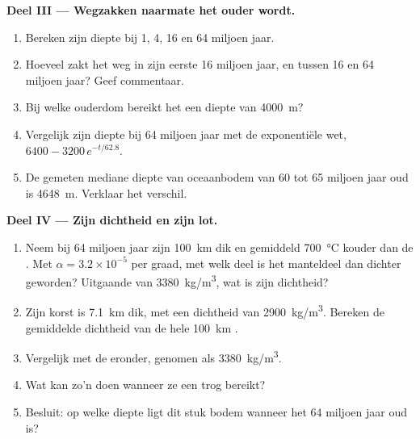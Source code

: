 \begin{problem}
\medskip
\noindent\textbf{Deel III --- Wegzakken naarmate het ouder wordt.}
\begin{enumerate}[resume]
  \item Bereken zijn diepte bij 1, 4, 16 en 64 miljoen jaar.
  \item Hoeveel zakt het weg in zijn eerste 16 miljoen jaar, en
        tussen 16 en 64 miljoen jaar? Geef commentaar.
  \item Bij welke ouderdom bereikt het een diepte van \qty{4000}{m}?
  \item Vergelijk zijn diepte bij 64 miljoen jaar met de exponentiële wet,
        $6400 - 3200\,e^{-t/62.8}$.
  \item De gemeten mediane diepte van oceaanbodem van 60 tot 65 miljoen jaar oud
        is \qty{4648}{m}. Verklaar het verschil.
\end{enumerate}

\medskip
\noindent\textbf{Deel IV --- Zijn dichtheid en zijn lot.}
\begin{enumerate}[resume]
  \item Neem bij 64 miljoen jaar zijn  \qty{100}{km} dik en
        gemiddeld \qty{700}{\celsius} kouder dan de . Met
        $\alpha = 3.2 \times 10^{-5}$ per graad, met welk deel is het
        manteldeel dan dichter geworden? Uitgaande van \qty{3380}{kg/m^3}, wat is
        zijn dichtheid?
  \item Zijn korst is \qty{7.1}{km} dik, met een dichtheid van
        \qty{2900}{kg/m^3}. Bereken de gemiddelde dichtheid van de hele
        \qty{100}{km} .
  \item Vergelijk met de  eronder, genomen als
        \qty{3380}{kg/m^3}.
  \item Wat kan zo'n  doen wanneer ze een trog bereikt?
  \item Besluit: op welke diepte ligt dit stuk bodem wanneer het 64
        miljoen jaar oud is?
\end{enumerate}
\end{problem}
